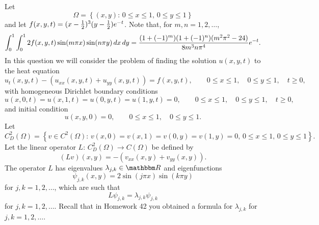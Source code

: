 
Let
\[
\Omega=\left\{(x,y):\,0\le x\le 1,\,0\le y\le 1\right\}
\]
and let $f(x,y,t) = (x-{1 \over 2})^3 (y-{1 \over 2}) e^{-t}$. Note that, for $m,n=1,2,\ldots$,
\[
\int_0^1 \int_0^1 2 f(x,y,t) \sin(m \pi x) \sin(n \pi y)\,dx\,dy= {(1+(-1)^m)(1+(-1)^n) (m^2\pi^2-24)\over 8 m^3 n \pi^4} e^{-t}.
\]
In this question we will consider the problem of finding the solution $u(x,y,t)$ to the heat equation
\[ 
u_t(x,y,t)-(u_{xx}(x,y,t) +u_{yy}(x,y,t)) = f(x,y,t), \qquad 0\le x \le 1, \quad 0\le y\le 1, \quad t\ge 0,
\]
with homogeneous Dirichlet boundary conditions
\[
u(x,0,t)=u(x,1,t)=u(0,y,t)=u(1,y,t)=0, \qquad 0\le x \le 1, \quad 0\le y\le 1, \quad t\ge 0,
\]
and initial condition
\[
u(x,y,0) = 0, \qquad 0\le x\le 1, \quad 0\le y\le 1.
\]
Let
\[
C^2_D(\Omega)=\left\{v\in C^2(\Omega):\,v(x,0)=v(x,1)=v(0,y)=v(1,y)=0,\,0\le x\le 1,\,0\le y\le 1\right\}.
\]
Let the linear operator $L:\,C^2_D(\Omega)\rightarrow C(\Omega)$ be defined by
\[
\left(L v\right)(x,y) = -\left(v_{xx}(x,y) + v_{yy}(x,y)\right).
\]
The operator $L$ has eigenvalues $\lambda_{j,k}\in\R$ and eigenfunctions
\[
\psi_{j,k}(x,y) = 2 \sin(j \pi x) \sin(k \pi y)
\]
for $j,k = 1,2,\ldots$, which are such that
\[
L\psi_{j,k}=\lambda_{j,k}\psi_{j,k}
\]
for $j,k = 1,2,\ldots$. Recall that in Homework 42 you obtained a formula for $\lambda_{j,k}$ for $j,k = 1,2,\ldots$.
\\
